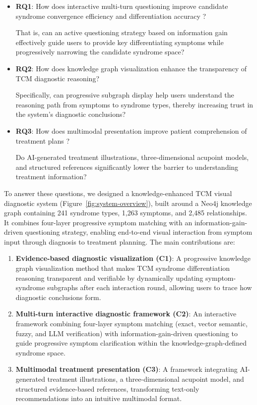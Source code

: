 \begin{itemize}
  \item \textbf{RQ1}: How does interactive multi-turn questioning improve candidate syndrome convergence efficiency and differentiation accuracy ? 
  
That is, can an active questioning strategy based on information gain effectively guide users to provide key differentiating symptoms while progressively narrowing the candidate syndrome space?

  \item \textbf{RQ2}: How does knowledge graph visualization enhance the transparency of TCM diagnostic reasoning? 
  
Specifically, can progressive subgraph display help users understand the reasoning path from symptoms to syndrome types, thereby increasing trust in the system's diagnostic conclusions?

  \item \textbf{RQ3}: How does multimodal presentation improve patient comprehension of treatment plans ? 

Do AI-generated treatment illustrations, three-dimensional acupoint models, and structured references significantly lower the barrier to understanding treatment information?
\end{itemize}

To answer these questions, we designed a knowledge-enhanced TCM visual diagnostic system (Figure~\ref{fig:system-overview}), built around a Neo4j knowledge graph containing 241 syndrome types, 1,263 symptoms, and 2,485 relationships. It combines four-layer progressive symptom matching with an information-gain-driven questioning strategy, enabling end-to-end visual interaction from symptom input through diagnosis to treatment planning. The main contributions are:

\begin{enumerate}
  \item \textbf{Evidence-based diagnostic visualization (C1)}: A progressive knowledge graph visualization method that makes TCM syndrome differentiation reasoning transparent and verifiable by dynamically updating symptom-syndrome subgraphs after each interaction round, allowing users to trace how diagnostic conclusions form.

  \item \textbf{Multi-turn interactive diagnostic framework (C2)}: An interactive framework combining four-layer symptom matching (exact, vector semantic, fuzzy, and LLM verification) with information-gain-driven questioning to guide progressive symptom clarification within the knowledge-graph-defined syndrome space.

  \item \textbf{Multimodal treatment presentation (C3)}: A framework integrating AI-generated treatment illustrations, a three-dimensional acupoint model, and structured evidence-based references, transforming text-only recommendations into an intuitive multimodal format.
\end{enumerate}

